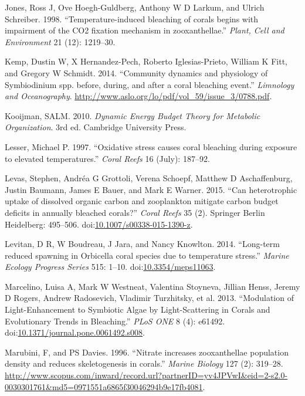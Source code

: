 \documentclass[]{elsarticle} %
\begin{document}
\hypertarget{ref-Jones:1998p3572}{}
Jones, Ross J, Ove Hoegh-Guldberg, Anthony W D Larkum, and Ulrich
Schreiber. 1998. ``Temperature-induced bleaching of corals begins with
impairment of the CO2 fixation mechanism in zooxanthellae.''
\emph{Plant, Cell and Environment} 21 (12): 1219--30.

\hypertarget{ref-Kemp:2014ug}{}
Kemp, Dustin W, X Hernandez-Pech, Roberto Iglesias-Prieto, William K
Fitt, and Gregory W Schmidt. 2014. ``Community dynamics and physiology
of Symbiodinium spp. before, during, and after a coral bleaching
event.'' \emph{Limnology and Oceanography}.
\url{http://www.aslo.org/lo/pdf/vol_59/issue_3/0788.pdf}.

\hypertarget{ref-Kooijman:2010vd}{}
Kooijman, SALM. 2010. \emph{Dynamic Energy Budget Theory for Metabolic
Organization}. 3rd ed. Cambridge University Press.

\hypertarget{ref-Lesser:1997p3587}{}
Lesser, Michael P. 1997. ``Oxidative stress causes coral bleaching
during exposure to elevated temperatures.'' \emph{Coral Reefs} 16
(July): 187--92.

\hypertarget{ref-Levas:2015ic}{}
Levas, Stephen, Andréa G Grottoli, Verena Schoepf, Matthew D
Aschaffenburg, Justin Baumann, James E Bauer, and Mark E Warner. 2015.
``Can heterotrophic uptake of dissolved organic carbon and zooplankton
mitigate carbon budget deficits in annually bleached corals?''
\emph{Coral Reefs} 35 (2). Springer Berlin Heidelberg: 495--506.
doi:\href{https://doi.org/10.1007/s00338-015-1390-z}{10.1007/s00338-015-1390-z}.

\hypertarget{ref-Levitan:2014et}{}
Levitan, D R, W Boudreau, J Jara, and Nancy Knowlton. 2014. ``Long-term
reduced spawning in Orbicella coral species due to temperature stress.''
\emph{Marine Ecology Progress Series} 515: 1--10.
doi:\href{https://doi.org/10.3354/meps11063}{10.3354/meps11063}.

\hypertarget{ref-Marcelino:2013hz}{}
Marcelino, Luisa A, Mark W Westneat, Valentina Stoyneva, Jillian Henss,
Jeremy D Rogers, Andrew Radosevich, Vladimir Turzhitsky, et al. 2013.
``Modulation of Light-Enhancement to Symbiotic Algae by Light-Scattering
in Corals and Evolutionary Trends in Bleaching.'' \emph{PLoS ONE} 8 (4):
e61492.
doi:\href{https://doi.org/10.1371/journal.pone.0061492.s008}{10.1371/journal.pone.0061492.s008}.

\hypertarget{ref-Marubini:1996p8460}{}
Marubini, F, and PS Davies. 1996. ``Nitrate increases zooxanthellae
population density and reduces skeletogenesis in corals.'' \emph{Marine
Biology} 127 (2): 319--28.
\url{http://www.scopus.com/inward/record.url?partnerID=yv4JPVwI\&eid=2-s2.0-0030301761\&md5=0971551a6865f30046294b9e17fb4081}.
\end{document}
